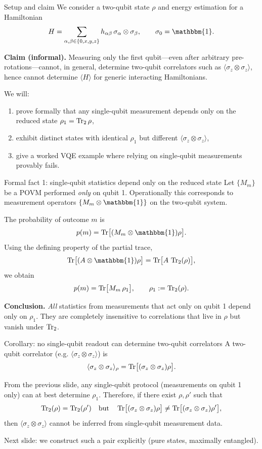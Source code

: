 \documentclass[aspectratio=169]{beamer}
\newcommand{\Z}{\sigma_z}
\newcommand{\I}{\mathbbm{1}}
\begin{document}
\begin{frame}{Setup and claim}
We consider a two-qubit state \(\rho\) and energy estimation for a Hamiltonian
\[
H = \sum_{\alpha,\beta\in\{0,x,y,z\}} h_{\alpha\beta}\, \sigma_\alpha\otimes\sigma_\beta,
\qquad \sigma_0=\I.
\]

\medskip
\textbf{Claim (informal).}
Measuring only the first qubit---even after arbitrary pre-rotations---cannot, in general, determine
two-qubit correlators such as \(\langle \Z\otimes\Z\rangle\), hence cannot determine \(\langle H\rangle\)
for generic interacting Hamiltonians.

\medskip
We will:
\begin{enumerate}
\item prove formally that any single-qubit measurement depends only on the reduced state \(\rho_1=\Tr_2\rho\),
\item exhibit distinct states with identical \(\rho_1\) but different \(\langle \Z\otimes\Z\rangle\),
\item give a worked VQE example where relying on single-qubit measurements provably fails.
\end{enumerate}
\end{frame}

\begin{frame}{Formal fact 1: single-qubit statistics depend only on the reduced state}
Let \(\{M_m\}\) be a POVM performed \emph{only} on qubit 1. Operationally this corresponds to
measurement operators \(\{M_m\otimes \I\}\) on the two-qubit system.

\medskip
The probability of outcome \(m\) is
\[
p(m)=\Tr\!\big[(M_m\otimes \I)\rho\big].
\]
Using the defining property of the partial trace,
\[
\Tr\!\big[(A\otimes \I)\rho\big] = \Tr\!\big[A\,\Tr_2(\rho)\big],
\]
we obtain
\[
p(m)=\Tr\!\big[M_m\,\rho_1\big],\qquad \rho_1:=\Tr_2(\rho).
\]

\medskip
\textbf{Conclusion.} \emph{All} statistics from measurements that act only on qubit 1 depend only on \(\rho_1\).
They are completely insensitive to correlations that live in \(\rho\) but vanish under \(\Tr_2\).
\end{frame}


\begin{frame}{Corollary: no single-qubit readout can determine two-qubit correlators}
A two-qubit correlator (e.g. \(\langle \Z\otimes\Z\rangle\)) is
\[
\langle \Z\otimes\Z\rangle_\rho=\Tr\!\big[(\Z\otimes\Z)\rho\big].
\]

From the previous slide, any single-qubit protocol (measurements on qubit 1 only) can at best determine \(\rho_1\).
Therefore, if there exist \(\rho,\rho'\) such that
\[
\Tr_2(\rho)=\Tr_2(\rho') \quad \text{but} \quad
\Tr\!\big[(\Z\otimes\Z)\rho\big]\neq \Tr\!\big[(\Z\otimes\Z)\rho'\big],
\]
then \(\langle \Z\otimes\Z\rangle\) cannot be inferred from single-qubit measurement data.

\medskip
Next slide: we construct such a pair explicitly (pure states, maximally entangled).
\end{frame}
\end{document}
